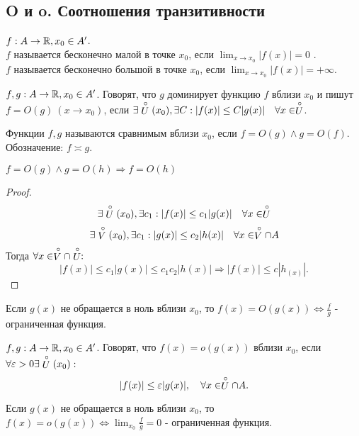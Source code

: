 \documentclass[12pt]{report}
\begin{document}
\subsection{O и o. Соотношения транзитивности}\label{ques_39}
\begin{defn}
    $f : A \to \mathbb{R}, x_0 \in  A'$.\\
    $f$ называется бесконечно малой в точке $x_0$, если $\lim_{x \to x_0} |f(x)| = 0$ .\\
    $f$ называется бесконечно большой в точке $x_0$, если $\lim_{x \to  x_0} |f(x)| = +\infty$.
\end{defn}
\begin{defn}
    $f, g: A \to  \mathbb{R}, x_0 \in  A'$. Говорят, что $g$ доминирует функцию $f$ вблизи $x_0$ и пишут $f = O(g) ~ (x \to  x_0)$, если $\exists \stackrel \circ U(x_0) , \exists C:  |f(x)| \le  C |g(x)| \quad \forall x \in  \stackrel \circ U$.
\end{defn}
\begin{defn}
    Функции $f, g$ называются сравнимым вблизи $x_0$, если $f=O(g) \wedge g = O(f)$.  Обозначение: $f \asymp g$.
\end{defn}
\begin{prop}
    $f=O(g) \wedge g=O(h) \Longrightarrow f = O(h)$
\end{prop}
\begin{proof}
    $$\exists \stackrel \circ U (x_0), \exists c_1: |f(x)| \le c_1 |g(x)| \quad \forall x \in  \stackrel \circ U$$
    $$\exists \stackrel \circ V (x_0), \exists c_1: |g(x)| \le c_2 |h(x)| \quad \forall x \in  \stackrel \circ V \cap A$$
    Тогда  $\forall x \in  \stackrel \circ V \cap \stackrel \circ U:$
    \[
	|f(x)| \le  c_1 |g(x)| \le  c_1 c_2 |h(x)| \Rightarrow |f(x)| \le  c |h_(x)|
    .\] 
\end{proof}
\begin{note}
    Если $g(x)$ не обращается в ноль вблизи  $x_0$, то $f(x) = O(g(x)) \Longleftrightarrow \frac{f}{g}$ - ограниченная функция.
\end{note}
\begin{defn}
    $f, g: A \to  \mathbb{R}, x_0 \in  A'$. Говорят, что $f(x) = o(g(x))$ вблизи $x_0$, если  $\forall \varepsilon >0 \exists \stackrel \circ U(x_0): $ 
    \[
	|f(x)| \le \varepsilon |g(x)|, \quad \forall x \in  \stackrel \circ U \cap A
    .\] 
\end{defn}
\begin{note}
    Если $g(x)$ не обращается в ноль вблизи  $x_0$, то $f(x) = o(g(x)) \Longleftrightarrow \lim_{x_0}\frac{f}{g}=0$ - ограниченная функция.
\end{note}
\end{document}
